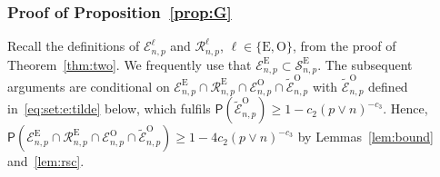 \documentclass[11pt, a4paper]{article}
\newcommand{\mc}{\mathcal}
\def\wt{\widetilde}
\newcommand{\p}{\mathsf{P}}
\newcommand{\tE}{\text{E}}
\newcommand{\tO}{\text{O}}
\theoremstyle{definition}
\theoremstyle{definition}
\theoremstyle{definition}
\theoremstyle{definition}
\theoremstyle{definition}
\theoremstyle{remark}
\theoremstyle{definition}
\theoremstyle{definition}
\theoremstyle{definition}
\begin{document}
\subsubsection{Proof of Proposition~\ref{prop:G}}

Recall the definitions of $\mc E^\ell_{n, p}$ and $\mc R^\ell_{n, p}$, $\ell \in \{\tE, \tO\}$, from the proof of Theorem~\ref{thm:two}. We frequently use that $\mc E^{\tE}_{n, p} \subset \mc S^{\tE}_{n, p}$.
The subsequent arguments are conditional on $\mc E^{\tE}_{n, p} \cap \mc R^{\tE}_{n, p} \cap \mc E^{\tO}_{n, p} \cap \wt{\mc E}^{\tO}_{n, p}$ with $\wt{\mc E}^{\tO}_{n, p}$ defined in~\eqref{eq:set:e:tilde} below, which fulfils $\p(\wt{\mc E}^{\tO}_{n, p}) \ge 1 - c_2(p \vee n)^{-c_3}$.
Hence, $\p(\mc E^{\tE}_{n, p} \cap \mc R^{\tE}_{n, p} \cap \mc E^{\tO}_{n, p} \cap \wt{\mc E}^{\tO}_{n, p}) \ge 1 - 4 c_2 (p \vee n)^{-c_3}$ by Lemmas~\ref{lem:bound} and~\ref{lem:rsc}.
\end{document}
